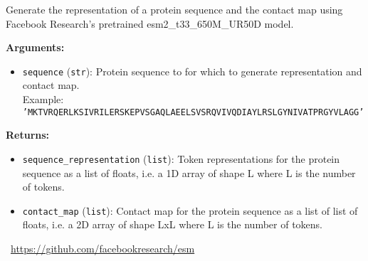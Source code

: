 \begin{tcolorbox}[title={\texttt{esm\_fold\_predict}}]
Generate the representation of a protein sequence and the contact map using Facebook Research's pretrained esm2\_t33\_650M\_UR50D model.

\vspace{.5em}
\textbf{Arguments:}
\begin{itemize}[topsep=0pt,parsep=-1pt,partopsep=0pt]
\item \texttt{sequence} (\texttt{str}): Protein sequence to for which to generate representation and contact map.\\  Example: \texttt{'MKTVRQERLKSIVRILERSKEPVSGAQLAEELSVSRQVIVQDIAYLRSLGYNIVATPRGYVLAGG'}
\end{itemize}

\vspace{.5em}
\textbf{Returns:} \begin{itemize}[topsep=0pt,parsep=-1pt,partopsep=0pt]
\item \texttt{sequence\_representation} (\texttt{list}): Token representations for the protein sequence as a list of floats, i.e. a 1D array of shape L where L is the number of tokens.
\item \texttt{contact\_map} (\texttt{list}): Contact map for the protein sequence as a list of list of floats, i.e. a 2D array of shape LxL where L is the number of tokens.
\end{itemize}
\tcblower
\setlength{\hangindent}{\widthof{\faGithub~}}
\faGithub~\url{https://github.com/facebookresearch/esm}

\vspace{.5em}\setlength{\hangindent}{\widthof{\faFile*[regular]~}}\faFile*[regular]~


\vspace{.5em}\setlength{\hangindent}{\widthof{\faFile*[regular]~}}\faFile*[regular]~


\end{tcolorbox}

